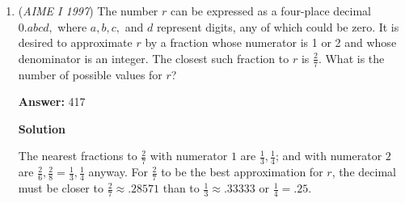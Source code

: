 \begin{enumerate}
 
 \begin{eqnarray*} 5^2 + x^2 &=& (5+r)^2 \\ x &=& \sqrt{10r + r^2} \\ && \\ (8 + r + \sqrt{10r+r^2})^2 + 5^2 &=& 13^2\\ 8 + r + \sqrt{10r+r^2} &=& 12\\ \sqrt{10r+r^2}&=& 4-r\\ 10r+r^2 &=& 16 - 8r + r^2\\ r &=& \frac{8}{9} \end{eqnarray*}

 So $m+n = \boxed{17}$.

 
NOTE: It can be seen that there is no apparent need to use the variable x as a 5,12,13 right triangle has been formed.

 Using the 5,12,13 triangle will lead to the equation $5^2+(12-8-r)^2=(5+r)^2$ which yields the same solution.

 



\textbf{Solution 2}

We may also use Descartes' theorem, $k_4=k_1+k_2+k_3\pm 2\sqrt{k_1k_2+k_2k_3+k_3k_1}$ where each of $k_i$ is the curvature of a circle with radius $r_i$, and the curvature is defined as $k_i=\frac{1}{r_i}$. The larger solution for $k_4$ will give the curvature of the circle externally tangent to the other circles, while the smaller solution will give the curvature for the circle internally tangent to each of the other circles. Using Descartes' theorem, we get $k_4=\frac15+\frac15+\frac18+2\sqrt{\frac{1}{40}+\frac{1}{40}+\frac{1}{25}}=\frac{21}{40}+2\sqrt{\frac{45}{500}}=\frac{45}{40}$. Thus, $r_4=\frac{1}{k_4}=\frac{40}{45}=\frac89$, and the answer is $\boxed{017}$



	\item (\textit{AIME I 1997}) The number $r$ can be expressed as a four-place decimal $0.abcd,$ where $a, b, c,$ and $d$ represent digits, any of which could be zero.  It is desired to approximate $r$ by a fraction whose numerator is 1 or 2 and whose denominator is an integer. The closest such fraction to $r$ is $\frac 27.$  What is the number of possible values for $r$?


 
 \textbf{Answer: }417



\textbf{Solution}

The nearest fractions to $\frac 27$ with numerator $1$ are $\frac 13, \frac 14$; and with numerator $2$ are $\frac 26, \frac 28 = \frac 13, \frac 14$ anyway. For $\frac 27$ to be the best approximation for $r$, the decimal must be closer to $\frac 27 \approx .28571$ than to $\frac 13 \approx .33333$ or $\frac 14 = .25$.


\end{enumerate}
